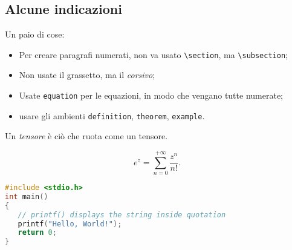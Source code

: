 

\subsection{Alcune indicazioni}

Un paio di cose:
\begin{itemize}
\item Per creare paragrafi numerati, non va usato \lstinline|\section|, ma \lstinline|\subsection|;
\item Non usate il grassetto, ma il \emph{corsivo};
\item Usate \texttt{equation}  per le equazioni, in modo che vengano tutte numerate;
\item usare gli ambienti \lstinline|definition|, \lstinline|theorem|, \lstinline|example|.
\end{itemize}

\begin{definition}[Tensore]
Un \emph{tensore} è ciò che ruota come un tensore.
\end{definition}

\begin{equation}
e^{z}=\sum_{n=0}^{+\infty} \frac{z^n}{n!}.
\end{equation}

\lipsum[3]

\begin{lstlisting}[language=C]
#include <stdio.h>
int main()
{
   // printf() displays the string inside quotation
   printf("Hello, World!");
   return 0;
}
\end{lstlisting}
